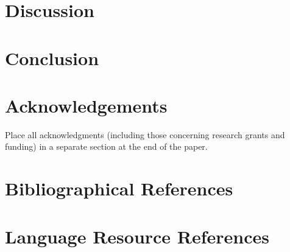 \documentclass[10pt, a4paper]{article}
\begin{document}


\section{Discussion}


\section{Conclusion}


\section{Acknowledgements}

Place all acknowledgments (including those concerning research grants and funding) in a separate section at the end of the paper.

\nocite{*}
\section{Bibliographical References}\label{sec:reference}




\section{Language Resource References}
\label{lr:ref}
\end{document}
